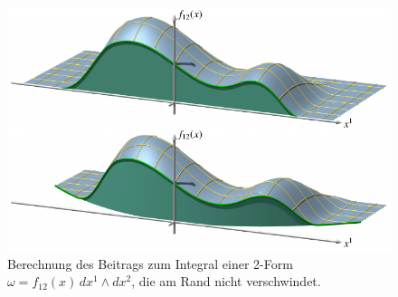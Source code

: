 %
%
%
\begin{figure}
\centering
\includegraphics{chapters/040-green/images/greenrand.pdf}
\caption{Berechnung des Beitrags zum Integral einer 2-Form
$\omega = f_{12}(x)\,dx^1\wedge dx^2$, die am Rand nicht
verschwindet.
\label{buch:green:green:fig:greenrand}}
\end{figure}
